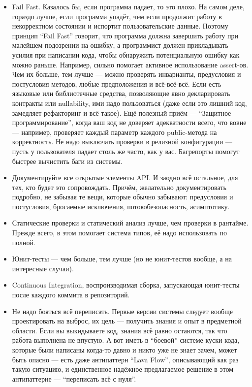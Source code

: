 \documentclass[a5paper]{article}
\begin{document}
\begin{itemize}
	\item Fail Fast. Казалось бы, если программа падает, то это плохо. На самом деле, гораздо лучше, если программа упадёт, чем если продолжит работу в некорректном состоянии и испортит пользовательские данные. Поэтому принцип ``Fail Fast'' говорит, что программа должна завершить работу при малейшем подозрении на ошибку, а программист должен прикладывать усилия при написании кода, чтобы обнаружить потенциальную ошибку как можно раньше. Например, сильно помогает активное использование assert-ов. Чем их больше, тем лучше --- можно проверять инварианты, предусловия и постусловия методов, любые предположения и всё-всё-всё. Если есть языковые или библиотечные средства, позволяющие явно декларировать контракты или nullability, ими надо пользоваться (даже если это лишний код, замедляет рефакторинг и всё такое). Ещё полезный приём --- ``Защитное программирование'', когда ваш код не доверяет адекватности всего, что вовне --- например, проверяет каждый параметр каждого public-метода на корректность. Не надо выключать проверки в релизной конфигурации --- пусть у пользователя падает столь же часто, как у вас. Багрепорты помогут быстрее вычистить баги из системы.
	\item Документируйте все открытые элементы API. И заодно всё остальное, для тех, кто будет это сопровождать. Причём, желательно документировать подробно, не забывая те вещи, которые обычно забывают: предусловия и постусловия, бросаемые исключения, потокобезопасность, асимптотику.
	\item Статические проверки и статический анализ лучше, чем проверки в рантайме. Прежде всего, в этом помогает система типов, её надо использовать по полной.
	\item Юнит-тесты --- чем больше, тем лучше (но не юнит-тестов вообще, а на интересные случаи).
	\item Continuous Integration, воспроизводимая сборка, запускающая юнит-тесты после каждого коммита в репозиторий.
	\item Не надо бояться всё переписать. Первые версии системы следует вообще проектировать на выброс, их цель --- получить знания и опыт в предметной области. Если вы выкидываете код, знания всё равно остаются, так что работа выполнена не впустую. А вот иметь в ``боевой'' системе куски кода, которые были написаны когда-то давно и никто уже не знает зачем, может быть опасно --- есть даже антипаттерн ``Lava Flow'', описывающий как раз такую ситуацию, и единственное надёжное предлагаемое решение в этом антипаттерне --- ``переписать всё с нуля''.
\end{itemize}
\end{document}
